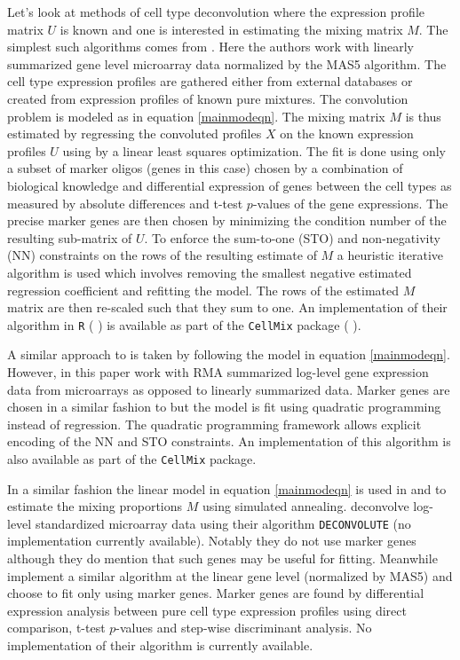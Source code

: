 \documentclass[reqno,12pt,oneside]{report}\usepackage[]{graphicx}\usepackage[]{color}
\renewcommand{\citet}[1]{(\citeauthor{#1} \citeyear{#1})}
\theoremstyle{plain}
\theoremstyle{definition}
\theoremstyle{remark}
\numberwithin{theorem}{chapter}     %
\begin{document}
Let's look at methods of cell type deconvolution where the expression profile matrix $U$ is known and one is interested in estimating the mixing matrix $M$. The simplest such algorithms comes from \cite{Abbas2009}. Here the authors work with linearly summarized gene level microarray data normalized by the  MAS5 algorithm. The cell type expression profiles are gathered either from external databases or created from expression profiles of known pure mixtures. The convolution problem is modeled as in equation \ref{mainmodeqn}. The mixing matrix $M$ is thus estimated by regressing the convoluted profiles $X$ on the known expression profiles $U$ using by a linear least squares optimization. The fit is done using only a subset of marker oligos (genes in this case) chosen by a combination of biological knowledge and differential expression of genes between the cell types as measured by absolute differences and t-test $p$-values of the gene expressions. The precise marker genes are then chosen by minimizing the condition number of the resulting sub-matrix of $U$. To enforce the sum-to-one (STO) and non-negativity (NN) constraints on the rows of the resulting estimate of $M$ a heuristic iterative algorithm is used which involves removing the smallest negative estimated regression coefficient and refitting the model. The rows of the estimated $M$ matrix are then re-scaled such that they sum to one. An implementation of their algorithm in \verb+R+ \citet{R2016} is available as part of the \verb+CellMix+ package \citet{Gaujoux2013}.

A similar approach to \citeauthor{Abbas2009} is taken by \cite{Gong2011} following the model in equation \ref{mainmodeqn}. However, in this paper \citeauthor{Gong2011} work with RMA summarized log-level gene expression data from microarrays as opposed to linearly summarized data. Marker genes are chosen in a similar fashion to \citeauthor{Abbas2009} but the model is fit using quadratic programming instead of regression. The quadratic programming framework allows explicit encoding of the NN and STO constraints. An implementation of this algorithm is also available as part of the \verb+CellMix+ package.

In a similar fashion the linear model in equation \ref{mainmodeqn} is used in \cite{Lu2003} and \cite{Wang2006} to estimate the mixing proportions $M$ using simulated annealing. \citeauthor{Lu2003} deconvolve log-level standardized microarray data using their algorithm \verb+DECONVOLUTE+ (no implementation currently available). Notably they do not use marker genes although they do mention that such genes may be useful for fitting. Meanwhile \cite{Wang2006} implement a similar algorithm at the linear gene level (normalized by MAS5) and choose to fit only using marker genes. Marker genes are found by differential expression analysis between pure cell type expression profiles using direct comparison, t-test $p$-values and step-wise discriminant analysis. No implementation of their algorithm is currently available.
\end{document}

